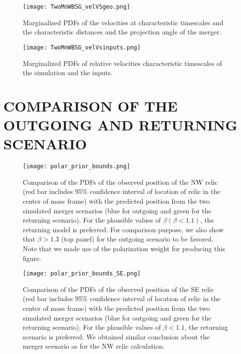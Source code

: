 \begin{figure*}
\begin{minipage}{180mm}
	\begin{center}
	\texttt{[image: TwoMnWBSG\_velVSgeo.png]}
	\caption{Marginalized PDFs of the velocities at characteristic timescales
		and the characteristic distances and the projection angle of the merger. }
	\end{center}
\end{minipage}
\end{figure*}
\begin{figure*}
\begin{minipage}{180mm}
	\begin{center}
	\texttt{[image: TwoMnWBSG\_velVsinputs.png]}
	\caption{Marginalized PDFs of relative velocities characteristic
	timescales of the simulation and the inputs.}
	\end{center}
\end{minipage}
\end{figure*}

\section{COMPARISON OF THE OUTGOING AND RETURNING SCENARIO}
\label{app:Bayes_factor}
%
\begin{figure}
	\texttt{[image: polar\_prior\_bounds.png]}
	\caption{Comparison of the PDFs of the observed position of the NW relic (red bar
		includes 95\% confidence interval of location of relic in the center of
		mass frame) with the	predicted position from the two simulated merger scenarios (blue for outgoing and green for the returning scenario). 
	For the plausible values of $\beta (\beta < 1.1)$, the returning model is preferred. 
	For comparison purpose, we also show that $\beta > 1.3$ (top panel) for the outgoing scenario to be favored. 
	Note that we made use of the polarization weight for producing this figure. 
	\label{fig: positionprior}}
\end{figure}

\begin{figure}
\texttt{[image: polar\_prior\_bounds\_SE.png]}
	\caption{Comparison of the PDFs of the observed position of the SE relic (red bar
		includes 95\% confidence interval of location of relic in the center of
		mass frame) with the predicted position from the two simulated merger scenarios (blue for outgoing and green for the returning scenario). 
	For the plausible values of $\beta < 1.1$, the returning scenario is preferred. 
	We obtained similar conclusion about the merger scenario as for the NW
	relic calculation.
	\label{fig:positionprior_SE}}
\end{figure}

